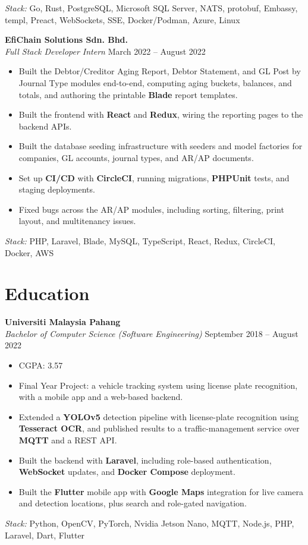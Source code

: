 \documentclass[11pt]{article}
\begin{document}
\textit{Stack:} Go, Rust, PostgreSQL, Microsoft SQL Server, NATS, protobuf, Embassy, templ, Preact, WebSockets, SSE, Docker/Podman, Azure, Linux

\textbf{EfiChain Solutions Sdn. Bhd.}\\
\textit{Full Stack Developer Intern} \hfill March 2022 -- August 2022

\begin{itemize}
  \item Built the Debtor/Creditor Aging Report, Debtor Statement, and GL Post by Journal Type modules end-to-end, computing aging buckets, balances, and totals, and authoring the printable \textbf{Blade} report templates.
  \item Built the frontend with \textbf{React} and \textbf{Redux}, wiring the reporting pages to the backend APIs.
  \item Built the database seeding infrastructure with seeders and model factories for companies, GL accounts, journal types, and AR/AP documents.
  \item Set up \textbf{CI/CD} with \textbf{CircleCI}, running migrations, \textbf{PHPUnit} tests, and staging deployments.
  \item Fixed bugs across the AR/AP modules, including sorting, filtering, print layout, and multitenancy issues.
\end{itemize}

\textit{Stack:} PHP, Laravel, Blade, MySQL, TypeScript, React, Redux, CircleCI, Docker, AWS

\section{Education}

\textbf{Universiti Malaysia Pahang}\\
\textit{Bachelor of Computer Science (Software Engineering)} \hfill September 2018 -- August 2022

\begin{itemize}
  \item CGPA: 3.57
  \item Final Year Project: a vehicle tracking system using license plate recognition, with a mobile app and a web-based backend.
  \item Extended a \textbf{YOLOv5} detection pipeline with license-plate recognition using \textbf{Tesseract OCR}, and published results to a traffic-management service over \textbf{MQTT} and a REST API.
  \item Built the backend with \textbf{Laravel}, including role-based authentication, \textbf{WebSocket} updates, and \textbf{Docker Compose} deployment.
  \item Built the \textbf{Flutter} mobile app with \textbf{Google Maps} integration for live camera and detection locations, plus search and role-gated navigation.
\end{itemize}

\textit{Stack:} Python, OpenCV, PyTorch, Nvidia Jetson Nano, MQTT, Node.js, PHP, Laravel, Dart, Flutter
\end{document}
